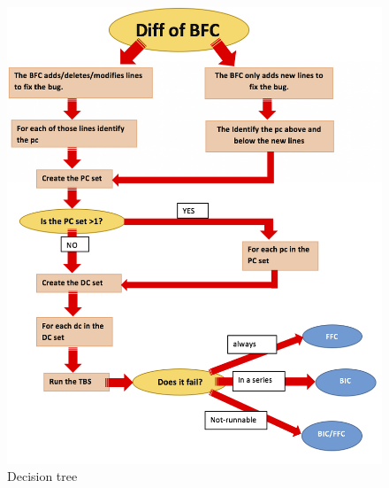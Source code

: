 \documentclass[a4paper, 12pt]{book}
\begin{document}
\begin{figure}[ht]
\centering
\includegraphics[width=\columnwidth]{img/algoritmo.png}
\caption{Decision tree }
\label{fig:Decision tree to identify the BIC and the FFC}       %
\end{figure}


\end{document}
